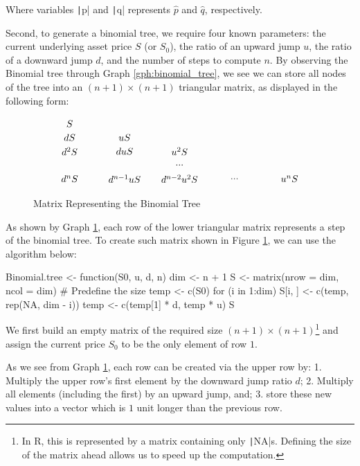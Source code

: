 Where variables \texttt|p| and \texttt|q| represents $\hat{p}$ and $\hat{q}$, respectively.

Second, to generate a binomial tree, we require four known parameters: the current underlying asset price $S$ (or $S_0$), the ratio of an upward jump $u$, the ratio of a downward jump $d$, and the number of steps to compute $n$. By observing the Binomial tree through Graph \ref{gph:binomial_tree}, we see we can store all nodes of the tree into an $(n+1)\times (n+1)$ triangular matrix, as displayed in the following form:

\begin{figure}[H]
    \centering
    \[\tikz{
        \node (a) at (0, 2) {$S$};
        \node (b) at (0, 1.5) {$dS$};
        \node (c) at (2, 1.5) {$uS$};
        \node (d) at (0, 1) {$d^2S$};
        \node (e) at (2, 1) {$duS$};
        \node (f) at (4, 1) {$u^2S$};
        \node (g) at (4, 0.5) {$...$};
        \node (h) at (0, 0) {$d^nS$};
        \node (i) at (2, 0) {$d^{n-1}uS$};
        \node (j) at (4, 0) {$d^{n-2}u^2S$};
        \node (k) at (6, 0) {$...$};
        \node (l) at (8, 0) {$u^nS$};
    }\]
    \caption{Matrix Representing the Binomial Tree} \label{gph:tree_matrix}
\end{figure}

As shown by Graph \ref{gph:tree_matrix}, each row of the lower triangular matrix represents a step of the binomial tree. To create such matrix shown in Figure \ref{gph:tree_matrix}, we can use the algorithm below:

\begin{Rminted}
Binomial.tree <- function(S0, u, d, n) {
    dim <- n + 1
    S <- matrix(nrow = dim, ncol = dim) # Predefine the size
    temp <- c(S0)
    for (i in 1:dim) {
        S[i, ] <- c(temp, rep(NA, dim - i))
        temp <- c(temp[1] * d, temp * u)
    }
    S
}
\end{Rminted}

We first build an empty matrix of the required size $(n+1)\times(n+1)$\footnote{In R, this is represented by a matrix containing only \texttt|NA|s. Defining the size of the matrix ahead allows us to speed up the computation.} and assign the current price $S_0$ to be the only element of row $1$.

As we see from Graph \ref{gph:tree_matrix}, each row can be created via the upper row by: 1. Multiply the upper row's first element by the downward jump ratio $d$; 2. Multiply all elements (including the first) by an upward jump, and; 3. store these new values into a vector which is $1$ unit longer than the previous row.

